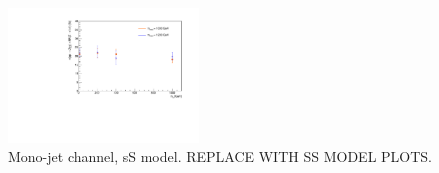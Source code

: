 \begin{figure}[!h]
\begin{center}
\includegraphics[width=0.45\textwidth]{figures/monoZ_sigma_limits_variedDMmass.pdf}
\caption{Mono-jet channel, sS model. REPLACE WITH SS MODEL PLOTS.}
\label{fig:Monojet_SSD_limit}
\end{center}
\end{figure}

